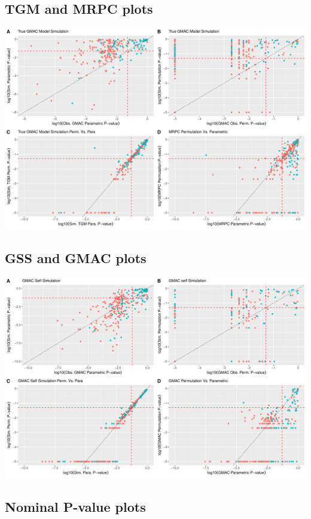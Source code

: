 \documentclass[
]{article}
\begin{document}
\hypertarget{tgm-and-mrpc-plots}{%
\subsection{TGM and MRPC plots}\label{tgm-and-mrpc-plots}}

\includegraphics{GMACwriteup2_files/figure-latex/unnamed-chunk-3-1.pdf}

\hypertarget{gss-and-gmac-plots}{%
\subsection{GSS and GMAC plots}\label{gss-and-gmac-plots}}

\includegraphics{GMACwriteup2_files/figure-latex/unnamed-chunk-4-1.pdf}

\hypertarget{nominal-p-value-plots}{%
\subsection{Nominal P-value plots}\label{nominal-p-value-plots}}
\end{document}
